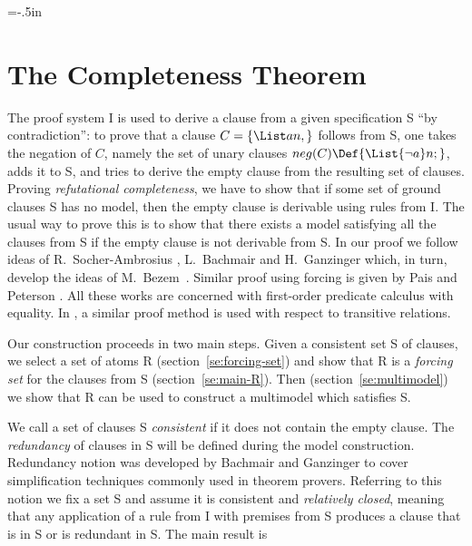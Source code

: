\voffset=-.5in


\section{The Completeness Theorem} \label{se:completeness}

The proof system \C I  is used to derive a clause from a given
specification \C S ``by contradiction'':
to prove that a clause
$C = \{\List an,\}$ follows from \C S, one takes the
negation of $C$, namely the set of unary clauses $neg(C)\Def\{ \List{\neg a}n;\}$,
adds it to \C S, and tries to derive the empty clause from the resulting
set of clauses.
Proving {\em refutational completeness}, we have to show that 
if some set of ground clauses \C S 
has no model, then the empty clause is derivable using rules from \C I. 
The
usual way to prove this is to show that there exists a model satisfying all the
clauses from \C S if the empty clause is not derivable from \C S. In our proof
we follow ideas of R.~Socher-Ambrosius \cite{S-A}, L.~Bachmair and 
H.~Ganzinger \cite{BG249} which, in
 turn, develop the ideas of M.~Bezem~\cite{Bez}. Similar
proof using forcing is given by Pais and Peterson \cite{PP}. All these
 works are concerned with first-order predicate calculus with equality.
In \cite{BG249}, a similar proof method is used with respect to 
transitive relations.

Our construction proceeds in two main steps. Given a consistent set \C S
of clauses, we select a set of atoms \C R (section~\ref{se:forcing-set})
and show that \C R is a {\em forcing set}\/ for  the clauses from \C S
(section~\ref{se:main-R}). Then (section~\ref{se:multimodel}) we show that
\C R can be used to construct a multimodel which satisfies \C S.

We call a set of clauses \C S {\em consistent} if it does not contain the
empty clause. The {\em redundancy} of clauses in \C S will be defined during
the model construction. Redundancy notion was developed by Bachmair and
Ganzinger \cite{BG} to cover simplification techniques commonly used in
theorem provers.  Referring to this notion we fix a set \C S and assume it is
consistent and {\em relatively closed}, meaning that any application of a
rule from \C I with premises from \C S produces a clause that is in \C S or is
redundant in \C S. The main result is

